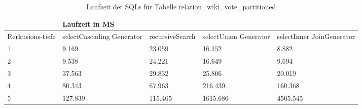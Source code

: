 \begin{table}[H]
	\centering
	\begin{tabular}{l|l|l|l|l|l|}
		\cline{2-6}
		& \multicolumn{5}{|l|}{Laufzeit in MS}                                                                                                                                                  \\ \hline
		\multicolumn{1}{|l|}{\multirow{2}{2cm}{Rerkusions-tiefe}} & \multicolumn{2}{|l|}{\multirow{2}{3cm}{selectCascading Generator}} & \multirow{2}{2.8cm}{recursiveSearch} & \multirow{2}{2.5cm}{selectUnion Generator} & \multirow{2}{2.5cm}{selectInner JoinGenerator} \\
		\multicolumn{1}{|l|}{}
		& \multicolumn{2}{|l|}{}                                           &                                  &                                     &                                           \\ \hline
		
\multicolumn{1}{|l|}{1}                                 & \multicolumn{2}{l|}{9.169}                                       & 23.059                                                & 16.152                                                    & 8.882                                                           \\ \hline
\multicolumn{1}{|l|}{2}                                 & \multicolumn{2}{l|}{9.538}                                       & 24.221                                                & 16.649                                                    & 9.694                                                           \\ \hline
\multicolumn{1}{|l|}{3}                                 & \multicolumn{2}{l|}{37.563}                                      & 29.832                                                & 25.806                                                    & 20.019                                                          \\ \hline
\multicolumn{1}{|l|}{4}                                 & \multicolumn{2}{l|}{80.343}                                      & 67.963                                                & 216.439                                                   & 160.368                                                         \\ \hline
\multicolumn{1}{|l|}{5}                                 & \multicolumn{2}{l|}{127.839}                                     & 115.465                                               & 1615.686                                                  & 4505.545                                                        \\ \hline

		
		
	\end{tabular}
	\caption{Laufzeit der SQLs für Tabelle relation\_wiki\_vote\_partitioned}
	\label{2.relationwikivotepartion.table}
\end{table}

